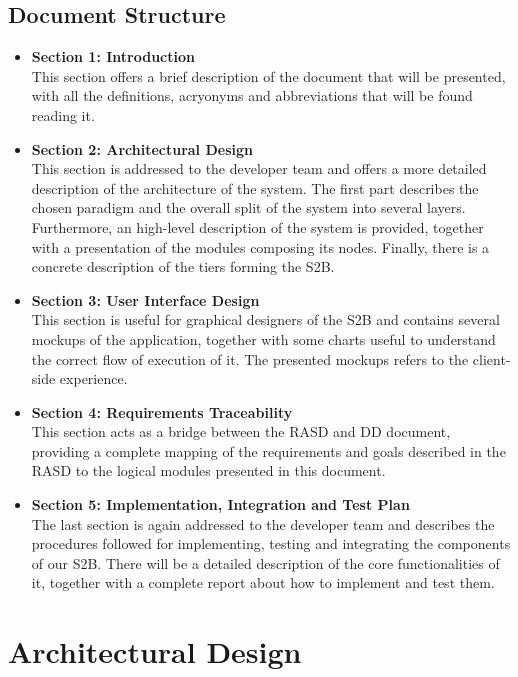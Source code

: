 \documentclass[table, 12pt]{article}
\begin{document}
\subsection{Document Structure}
\begin{itemize}
    \item \textbf{Section 1: Introduction}\\This section offers a brief description of the document that will be presented, with all the definitions, acryonyms and abbreviations that will be found reading it.
    \item \textbf{Section 2: Architectural Design}\\This section is addressed to the developer team and offers a more detailed description of the architecture of the system. The first part describes the chosen paradigm and the overall split of the system into several layers. Furthermore, an high-level description of the system is provided, together with a presentation of the modules composing its nodes. Finally, there is a concrete description of the tiers forming the S2B.
    \item \textbf{Section 3: User Interface Design}\\This section is useful for graphical designers of the S2B and contains several mockups of the application, together with some charts useful to understand the correct flow of execution of it. The presented mockups refers to the client-side experience.
    \item \textbf{Section 4: Requirements Traceability}\\This section acts as a bridge between the RASD and DD document, providing a complete mapping of the requirements and goals described in the RASD to the logical modules presented in this document.
    \item \textbf{Section 5: Implementation, Integration and Test Plan}\\The last section is again addressed to the developer team and describes the procedures followed for implementing, testing and integrating the components of our S2B. There will be a detailed description of the core functionalities of it, together with a complete report about how to implement and test them.
\end{itemize}

\newpage

\section{Architectural Design}
\end{document}

